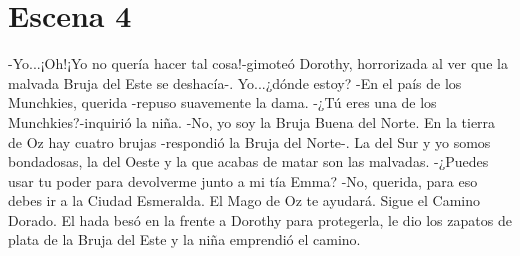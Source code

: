 \chapter{Escena 4}
-Yo...¡Oh!¡Yo no quería hacer tal cosa!-gimoteó Dorothy, horrorizada al ver que la malvada Bruja del Este se deshacía-. Yo...¿dónde estoy?
-En el país de los Munchkies, querida -repuso suavemente la dama.
-¿Tú eres una de los Munchkies?-inquirió la niña.
-No, yo soy la Bruja Buena del Norte. En la tierra de Oz hay cuatro brujas -respondió la Bruja del Norte-. La del Sur y yo somos bondadosas, la del Oeste y la que acabas de matar son las malvadas. 
-¿Puedes usar tu poder para devolverme junto a mi tía Emma?
-No, querida, para eso debes ir a la Ciudad Esmeralda. El Mago de Oz te ayudará. Sigue el Camino Dorado.
El hada besó en la frente a Dorothy para protegerla, le dio los zapatos de plata de la Bruja del Este y la niña emprendió el camino.